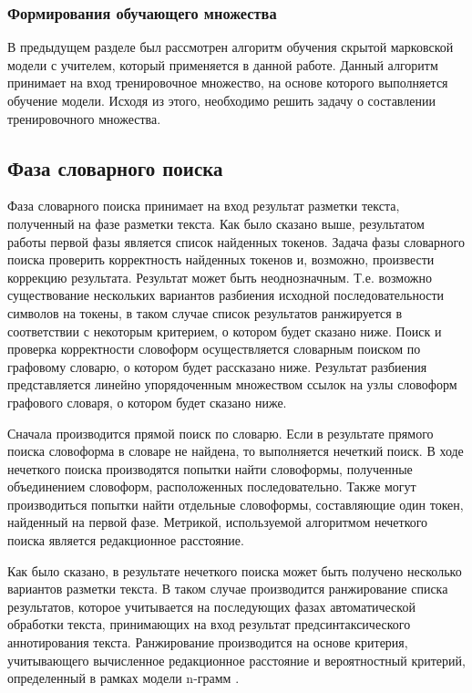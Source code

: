 \subsubsection{Формирования обучающего множества}
В предыдущем разделе был рассмотрен алгоритм обучения скрытой марковской модели с учителем, который применяется в данной работе. Данный алгоритм принимает на вход тренировочное множество, на основе которого выполняется обучение модели. Исходя из этого, необходимо решить задачу о составлении тренировочного множества.


\subsection{Фаза словарного поиска}
Фаза словарного поиска принимает на вход результат разметки текста, полученный на фазе разметки текста. Как было сказано выше, результатом работы первой фазы является список найденных токенов. Задача фазы словарного поиска проверить корректность найденных токенов и, возможно, произвести коррекцию результата. Результат может быть неоднозначным. Т.е. возможно существование нескольких вариантов разбиения исходной последовательности символов на токены, в таком случае список результатов ранжируется в соответствии с некоторым критерием, о котором будет сказано ниже. Поиск и проверка корректности словоформ осуществляется словарным поиском по графовому словарю, о котором будет рассказано ниже. Результат разбиения представляется линейно упорядоченным множеством \cite{vereshagin_shen} ссылок на узлы словоформ графового словаря, о котором будет сказано ниже. 

Сначала производится прямой поиск по словарю. Если в результате прямого поиска словоформа в словаре не найдена, то выполняется нечеткий поиск. В ходе нечеткого поиска производятся попытки найти словоформы, полученные объединением словоформ, расположенных последовательно. Также могут производиться попытки найти отдельные словоформы, составляющие один токен, найденный на первой фазе. Метрикой, используемой алгоритмом нечеткого поиска является редакционное расстояние.

Как было сказано, в результате нечеткого поиска может быть получено несколько вариантов разметки текста. В таком случае производится ранжирование списка результатов, которое учитывается на последующих фазах автоматической обработки текста, принимающих на вход результат предсинтаксического аннотирования текста. Ранжирование производится на основе критерия, учитывающего вычисленное редакционное расстояние и вероятностный критерий, определенный в рамках модели n-грамм \cite{probling}.

